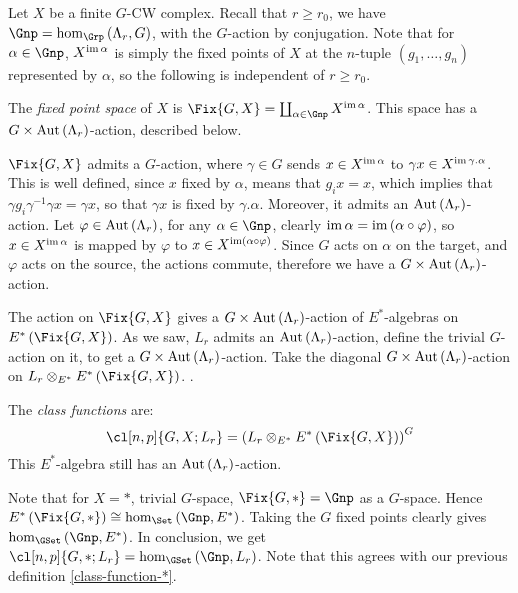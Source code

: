 Let $X$ be a finite $G$-CW complex.
Recall that $r \geq r_0$, we have $\Gnp = \hom_{\Grp}\left(\Lambda_r, G\right)$, with the $G$-action by conjugation.
Note that for $\alpha \in \Gnp$, $X^{\operatorname{im} \alpha}$ is simply the fixed points of $X$ at the $n$-tuple $\left(g_1, \dotsc, g_n\right)$ represented by $\alpha$, so the following is independent of $r \geq r_0$.

\begin{definition}
	The \emph{fixed point space} of $X$ is $\Fix{G,X} = \coprod_{\alpha \in \Gnp} X^{\im \alpha}$.
	This space has a $G \times \operatorname{Aut} \left(\Lambda_r\right)$-action, described below.
\end{definition}

$\Fix{G,X}$ admits a $G$-action, where $\gamma \in G$ sends $x \in X^{\operatorname{im} \alpha}$ to $\gamma x \in X^{\operatorname{im} \gamma.\alpha}$.
This is well defined, since $x$ fixed by $\alpha$, means that $g_i x = x$, which implies that $\gamma g_i \gamma^{-1} \gamma x = \gamma x$, so that $\gamma x$ is fixed by $\gamma. \alpha$.
Moreover, it admits an $\operatorname{Aut}\left(\Lambda_r\right)$-action.
Let $\varphi \in \operatorname{Aut}\left(\Lambda_r\right)$, for any $\alpha \in \Gnp$, clearly $\operatorname{im} \alpha = \operatorname{im} \left(\alpha\circ\varphi\right)$, so $x \in X^{\operatorname{im} \alpha}$ is mapped by $\varphi$ to $x \in X^{\operatorname{im} \left(\alpha\circ\varphi\right)}$.
Since $G$ acts on $\alpha$ on the target, and $\varphi$ acts on the source, the actions commute, therefore we have a $G \times \operatorname{Aut} \left(\Lambda_r\right)$-action.

The action on $\Fix{G,X}$ gives a $G \times \operatorname{Aut} \left(\Lambda_r\right)$-action of $E^*$-algebras on $E^*\left(\Fix{G,X}\right)$.
As we saw, $L_r$ admits an $\operatorname{Aut} \left(\Lambda_r\right)$-action, define the trivial $G$-action on it, to get a $G \times \operatorname{Aut} \left(\Lambda_r\right)$-action.
Take the diagonal $G \times \operatorname{Aut} \left(\Lambda_r\right)$-action on $L_r \otimes_{E^*} E^*\left(\Fix{G,X}\right)$.
.

\begin{definition}
	The \emph{class functions} are:
	$$
	\cl[n,p]{G,X; L_r}
	= \left(L_r \otimes_{E^*} E^*\left(\Fix{G,X}\right)\right)^G
	$$
	This $E^*$-algebra still has an $\operatorname{Aut} \left(\Lambda_r\right)$-action.
\end{definition}

Note that for $X = *$, trivial $G$-space, $\Fix{G,*} = \Gnp$ as a $G$-space.
Hence $E^*\left(\Fix{G,*}\right) \cong \hom_{\Set}\left(\Gnp, E^*\right)$.
Taking the $G$ fixed points clearly gives $\hom_{\GSet}\left(\Gnp, E^*\right)$.
In conclusion, we get $\cl[n,p]{G,*; L_r} =  \hom_{\GSet}\left(\Gnp, L_r\right)$.
Note that this agrees with our previous definition \ref{class-function-*}.

